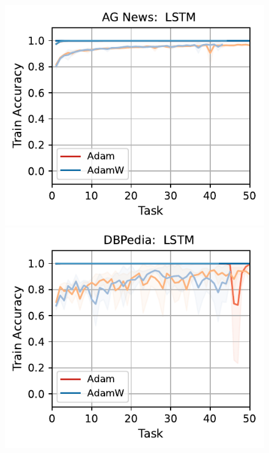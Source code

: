 \begin{figure}[htb!]
{    \includegraphics[width=\textwidth]{figs/Accuracy/nlp/lstm/ag_news_50.pdf}
    \includegraphics[width=\textwidth]{figs/Accuracy/nlp/lstm/dbpedia_50.pdf}
}
\end{figure}
